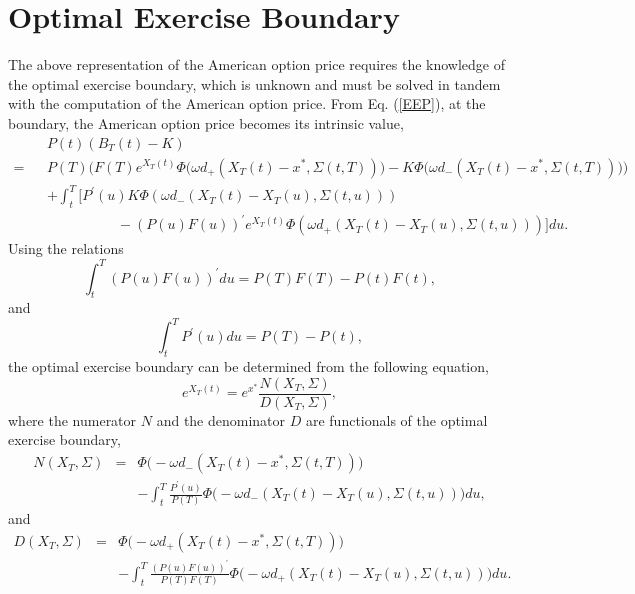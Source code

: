 \documentclass[12pt]{article}
\begin{document}
  \section{Optimal Exercise Boundary}

    The above representation of the American option price requires the knowledge of the optimal
    exercise boundary, which is unknown and must be solved in tandem with the computation of the American
    option price. From Eq. (\ref{EEP}), at the boundary, the American option price becomes its intrinsic
    value,
    \begin{eqnarray}
       \label{Boundary}
       && P(t)\left(B_T(t)-K\right)\nonumber\\
      =&& P(T)\bigg(F(T)e^{X_T(t)}\Phi\big(\omega d_+\left(X_T(t)-x^*,\Sigma(t,T)\right)\big)
                                                      -K\Phi\big(\omega d_-\left(X_T(t)-x^*,\Sigma(t,T)\right)\big)\bigg)\nonumber\\
       &&+\int_t^T\bigg[P^{\prime}(u)K\Phi\left(\omega d_-\left(X_T(t)-X_T(u), \Sigma(t,u)\right)\right)\nonumber\\
                 &&\quad\quad\quad\quad\quad
                  -\left(P(u)F(u)\right)^{\prime}e^{X_T(t)}\Phi\left(\omega d_+\left(X_T(t)-X_T(u), \Sigma(t,u)\right)\right)\bigg]du.
    \end{eqnarray}
    Using the relations
    \begin{equation}
      \int_t^T\left(P(u)F(u)\right)^{\prime}du=P(T)F(T)-P(t)F(t),
    \end{equation}
    and
    \begin{equation}
      \int_t^TP^{\prime}(u)du=P(T)-P(t),
    \end{equation}
    the optimal exercise boundary can be determined from the following equation,
    \begin{equation}
      e^{X_T(t)}=e^{x^*}\frac{N(X_T, \Sigma)}{D(X_T, \Sigma)},
    \end{equation}
    where the numerator $N$ and the denominator $D$ are functionals of the optimal exercise boundary,
    \begin{eqnarray}
      N(X_T, \Sigma)&=&\Phi\big(-\omega d_-\left(X_T(t)-x^*,\Sigma(t,T)\right)\big)\nonumber\\
      &&-\int_t^T\frac{P^{\prime}(u)}{P(T)}\Phi\big(-\omega d_-\left(X_T(t)-X_T(u),\Sigma(t,u)\right)\big)du,
    \end{eqnarray}
    and
    \begin{eqnarray}
      D(X_T, \Sigma)&=&\Phi\big(-\omega d_+\left(X_T(t)-x^*,\Sigma(t,T)\right)\big)\nonumber\\
      &&-\int_t^T\frac{\left(P(u)F(u)\right)^{\prime}}{P(T)F(T)}\Phi\big(-\omega d_+\left(X_T(t)-X_T(u),\Sigma(t,u)\right)\big)du.
    \end{eqnarray}
\end{document}

